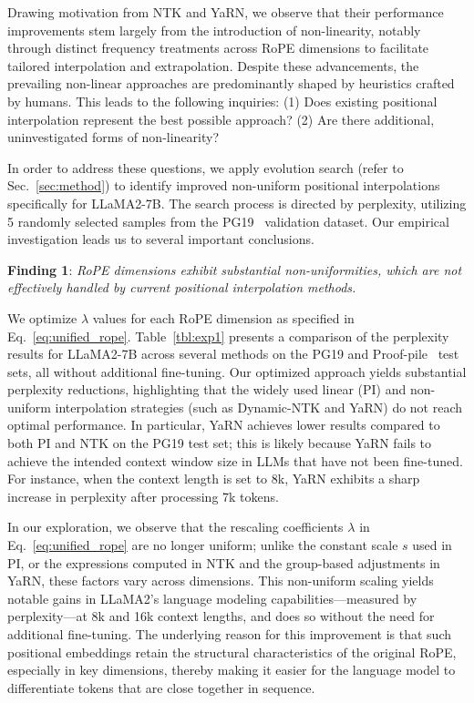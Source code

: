 Drawing motivation from NTK and YaRN, we observe that their performance improvements stem largely from the introduction of non-linearity, notably through distinct frequency treatments across RoPE dimensions to facilitate tailored interpolation and extrapolation. Despite these advancements, the prevailing non-linear approaches are predominantly shaped by heuristics crafted by humans. This leads to the following inquiries: (1) Does existing positional interpolation represent the best possible approach? (2) Are there additional, uninvestigated forms of non-linearity?

In order to address these questions, we apply evolution search (refer to Sec.~\ref{sec:method}) to identify improved non-uniform positional interpolations specifically for LLaMA2-7B. The search process is directed by perplexity, utilizing 5 randomly selected samples from the PG19~\cite{pg19} validation dataset. Our empirical investigation leads us to several important conclusions.

\textbf{Finding 1}: \textit{RoPE dimensions exhibit substantial non-uniformities, which are not effectively handled by current positional interpolation methods.}

We optimize $\lambda$ values for each RoPE dimension as specified in Eq.~\ref{eq:unified_rope}. Table~\ref{tbl:exp1} presents a comparison of the perplexity results for LLaMA2-7B across several methods on the PG19 and Proof-pile~\cite{proof-pile} test sets, all without additional fine-tuning. Our optimized approach yields substantial perplexity reductions, highlighting that the widely used linear (PI) and non-uniform interpolation strategies (such as Dynamic-NTK and YaRN) do not reach optimal performance. In particular, YaRN achieves lower results compared to both PI and NTK on the PG19 test set; this is likely because YaRN fails to achieve the intended context window size in LLMs that have not been fine-tuned. For instance, when the context length is set to 8k, YaRN exhibits a sharp increase in perplexity after processing 7k tokens.

In our exploration, we observe that the rescaling coefficients $\lambda$ in Eq.~\ref{eq:unified_rope} are no longer uniform; unlike the constant scale $s$ used in PI, or the expressions computed in NTK and the group-based adjustments in YaRN, these factors vary across dimensions. This non-uniform scaling yields notable gains in LLaMA2's language modeling capabilities—measured by perplexity—at 8k and 16k context lengths, and does so without the need for additional fine-tuning. The underlying reason for this improvement is that such positional embeddings retain the structural characteristics of the original RoPE, especially in key dimensions, thereby making it easier for the language model to differentiate tokens that are close together in sequence.

